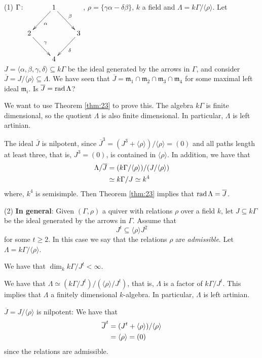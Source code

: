 \begin{exam}
(1) $\Gamma\colon \xymatrix{ & 1\ar[dl]^\alpha\ar[dr]^\beta & \\
2\ar[dr]^\gamma & & 3\ar[dl]^\delta \\
& 4 & 
}$, $\rho=\{\gamma\alpha - \delta\beta\}$, $k$ a field and $\Lambda =
k\Gamma/\langle \rho\rangle$.  Let $J = \langle \alpha, \beta, \gamma,
\delta\rangle \subseteq k\Gamma$ be the ideal generated by the arrows
in $\Gamma$, and consider $\overline{J} =
J/\langle\rho\rangle\subseteq \Lambda$.  We have seen that
$\overline{J} = \mathfrak{m}_1 \cap \mathfrak{m}_2 \cap \mathfrak{m}_3
\cap \mathfrak{m}_4$ for some maximal left ideal $\mathfrak{m}_i$.  Is
$\overline{J} = \operatorname{rad}\nolimits \Lambda$? 

We want to use Theorem \ref{thm:23} to prove this. The algebra
$k\Gamma$ is finite dimensional, so the quotient $\Lambda$ is also
finite dimensional.  In particular, $\Lambda$ is left artinian. 

The ideal $\overline{J}$ is nilpotent, since 
$\overline{J}^3 = (J^3 + \langle\rho\rangle)/\langle\rho\rangle = (0)$
and all paths length at least three, that is, $J^3=(0)$, is contained
in $\langle\rho\rangle$.  In addition, we have that 
\begin{align}
\Lambda/\overline{J} & = (k\Gamma/\langle\rho\rangle)/(J/\langle\rho\rangle)\notag\\ 
& \simeq k\Gamma/J \simeq k^4\notag
\end{align}
where, $k^4$ is semisimple.  Then Theorem \ref{thm:23} implies that
$\operatorname{rad}\nolimits\Lambda = \overline{J}$. 

(2) \textbf{In general}: Given $(\Gamma,\rho)$ a quiver with relations
$\rho$ over a field $k$, let $J \subseteq k\Gamma$ be the ideal
generated by the arrows in $\Gamma$.  Assume that 
\[J^t \subseteq \langle\rho\rangle J^2\]
for some $t\geq 2$.  In this case we say that the relations $\rho$ are
\emph{admissible}.  Let $\Lambda = k\Gamma/\langle\rho\rangle$. 

\begin{exer}
We have that $\dim_k k\Gamma/J^t < \infty$. 
\end{exer}

We have that $\Lambda \simeq (k\Gamma/J^t)/(\langle\rho\rangle/J^t)$,
that is, $\Lambda$ is a factor of $k\Gamma/J^t$.  This implies that
$\Lambda$ a finitely dimensional $k$-algebra.  In particular,
$\Lambda$ is left artinian.  

$\overline{J} = J/\langle\rho\rangle$ is nilpotent:  We have that 
\begin{align}
\overline{J}^t & = (J^t +
                 \langle\rho\rangle)/\langle\rho\rangle\notag\\
& = \langle\rho\rangle = (0)\notag
\end{align}
since the relations are admissible. 


\end{exam}
